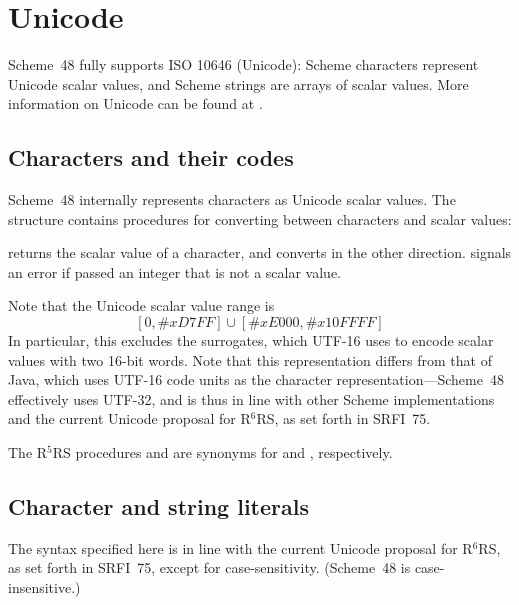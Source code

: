 \chapter{Unicode}

Scheme~48 fully supports ISO 10646 (Unicode): Scheme characters
represent Unicode scalar values, and Scheme strings are arrays of
scalar values.  More information on Unicode can be found at
.

\section{Characters and their codes}

Scheme~48 internally represents characters as Unicode scalar values.
The  structure contains procedures for converting
between characters and scalar values:
%
\begin{protos}
\end{protos}
%
 returns the scalar value of a character, and
 converts in the other direction.
 signals an error if passed an integer that is
not a scalar value.

Note that the Unicode scalar value range is
%
\begin{displaymath}
\left[0,\#x\mathit{D7FF}\right] \cup \left[\#x\mathit{E000}, \#x\mathit{10FFFF}\right]
\end{displaymath}
%
In particular, this excludes the surrogates, which UTF-16 uses to
encode scalar values with two 16-bit words.  Note that this
representation differs from that of Java, which uses UTF-16 code units
as the character representation---Scheme~48 effectively uses UTF-32,
and is thus in line with other Scheme implementations and the current
Unicode proposal for R$^6$RS, as set forth in SRFI~75.

The R$^5$RS procedures  and 
are synonyms for  and
, respectively.

\section{Character and string literals}

The syntax specified here is in line with the current Unicode proposal
for R$^6$RS, as set forth in SRFI~75, except for case-sensitivity.
(Scheme~48 is case-insensitive.)

